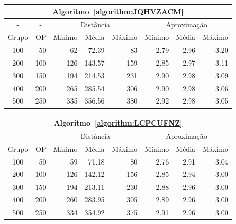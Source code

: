 \begin{table}[!htb]
  \begin{tabular}{|c|r|r|r|r|r|r|r|}
    \hline
    \multicolumn{8}{|c|}{Algoritmo~\ref{algorithm:JQHVZACM}}                                                  \\ \hline
      -      & \multicolumn{1}{c|}{-} & \multicolumn{3}{c|}{Distância}             & \multicolumn{3}{c|}{Aproximação}           \\ \hline
    Grupo    & OP                     & Mínimo       & Média        & Máximo       & Mínimo       & Média        & Máximo       \\ \hline  
    100      & 50                     & 62           &  72.39       &  83          & 2.79         & 2.96         & 3.20         \\ \hline
    200      & 100                    & 126          & 143.57       & 159          & 2.85         & 2.97         & 3.11         \\ \hline
    300      & 150                    & 194          & 214.53       & 231          & 2.90         & 2.98         & 3.09         \\ \hline
    400      & 200                    & 265          & 285.54       & 306          & 2.90         & 2.98         & 3.06         \\ \hline
    500      & 250                    & 335          & 356.56       & 380          & 2.92         & 2.98         & 3.05         \\ \hline    
  \end{tabular}

  \vspace{5mm}

  \begin{tabular}{|c|r|r|r|r|r|r|r|}
    \hline
    \multicolumn{8}{|c|}{Algoritmo~\ref{algorithm:LCPCUFNZ}}                                                  \\ \hline
      -      & \multicolumn{1}{c|}{-} & \multicolumn{3}{c|}{Distância}             & \multicolumn{3}{c|}{Aproximação}           \\ \hline
    Grupo    & OP                     & Mínimo       & Média        & Máximo       & Mínimo       & Média        & Máximo       \\ \hline  
    100      & 50                     & 59           &  71.18       & 80           & 2.76         & 2.91         & 3.04         \\ \hline
    200      & 100                    & 126          & 142.12       & 156          & 2.85         & 2.94         & 3.00         \\ \hline
    300      & 150                    & 194          & 213.11       & 230          & 2.88         & 2.96         & 3.00         \\ \hline
    400      & 200                    & 260          & 283.95       & 305          & 2.89         & 2.96         & 3.00         \\ \hline
    500      & 250                    & 334          & 354.92       & 375          & 2.91         & 2.96         & 3.00         \\ \hline    
  \end{tabular}

\end{table}
